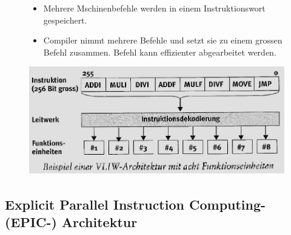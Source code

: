 \begin{figure}[htbp]
	
	\begin{minipage}{0.55\textwidth}
		\begin{itemize}[noitemsep,topsep=0pt]
			\item Mehrere Mschinenbefehle werden in einem Instruktionswort gespeichert.
			\item Compiler nimmt mehrere Befehle und setzt sie zu einem grossen Befehl zusammen. Befehl kann effizienter abgearbeitet werden.
			
		\end{itemize}
		
	\end{minipage}
	\hfill		
	\begin{minipage}{0.4\textwidth} 
		\includegraphics[width=\textwidth]{images/Rechnerarchitekturen/VILW.PNG}
	\end{minipage}
	
\end{figure}

\subsection{Explicit Parallel Instruction Computing- (EPIC-) Architektur}
 
